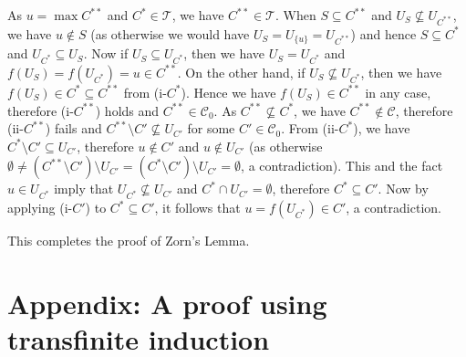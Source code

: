 \documentclass{article}
\begin{document}
As $u = \max C^{**}$ and $C^* \in \mathcal{T}$, we have $C^{**} \in \mathcal{T}$.
When $S \subseteq C^{**}$ and $U_S \not\subseteq U_{C^{**}}$, we have $u \not\in S$ (as otherwise we would have $U_S = U_{\{u\}} = U_{C^{**}}$) and hence $S \subseteq C^*$ and $U_{C^*} \subseteq U_S$.
Now if $U_S \subseteq U_{C^*}$, then we have $U_S = U_{C^*}$ and $f(U_S) = f(U_{C^*}) = u \in C^{**}$.
On the other hand, if $U_S \not\subseteq U_{C^*}$, then we have $f(U_S) \in C^* \subseteq C^{**}$ from (i-$C^*$).
Hence we have $f(U_S) \in C^{**}$ in any case, therefore (i-$C^{**}$) holds and $C^{**} \in \mathcal{C}_0$.
As $C^{**} \not\subseteq C^*$, we have $C^{**} \not\in \mathcal{C}$, therefore (ii-$C^{**}$) fails and $C^{**} \setminus C' \not\subseteq U_{C'}$ for some $C' \in \mathcal{C}_0$.
From (ii-$C^*$), we have $C^* \setminus C' \subseteq U_{C'}$, therefore $u \not\in C'$ and $u \not\in U_{C'}$ (as otherwise $\emptyset \neq (C^{**} \setminus C') \setminus U_{C'} = (C^* \setminus C') \setminus U_{C'} = \emptyset$, a contradiction).
This and the fact $u \in U_{C^*}$ imply that $U_{C^*} \not\subseteq U_{C'}$ and $C^* \cap U_{C'} = \emptyset$, therefore $C^* \subseteq C'$.
Now by applying (i-$C'$) to $C^* \subseteq C'$, it follows that $u = f(U_{C^*}) \in C'$, a contradiction.

This completes the proof of Zorn's Lemma.


\section*{Appendix: A proof using transfinite induction}
\end{document}
